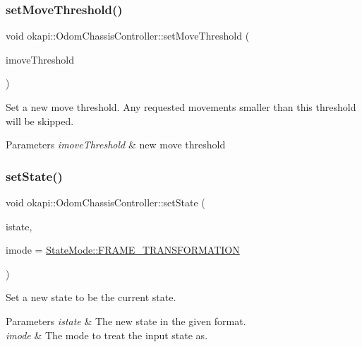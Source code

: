 \subsubsection{\texorpdfstring{setMoveThreshold()}{setMoveThreshold()}}
{\footnotesize\ttfamily void okapi\+::\+Odom\+Chassis\+Controller\+::set\+Move\+Threshold (\begin{DoxyParamCaption}\item[{const Q\+Length \&}]{imove\+Threshold }\end{DoxyParamCaption})\hspace{0.3cm}{\ttfamily [virtual]}}

Set a new move threshold. Any requested movements smaller than this threshold will be skipped.


\begin{DoxyParams}{Parameters}
{\em imove\+Threshold} & new move threshold \\
\hline
\end{DoxyParams}
\mbox{\label{classokapi_1_1OdomChassisController_a843ab24d9ed26ba68833ece0b28bf345}} 
\subsubsection{\texorpdfstring{setState()}{setState()}}
{\footnotesize\ttfamily void okapi\+::\+Odom\+Chassis\+Controller\+::set\+State (\begin{DoxyParamCaption}\item[{const \mbox{\hyperlink{structokapi_1_1OdomState}{Odom\+State}} \&}]{istate,  }\item[{const \mbox{\hyperlink{namespaceokapi_af37fbd761bd859a00ff4dd4a87dd8c07}{State\+Mode}} \&}]{imode = {\ttfamily \mbox{\hyperlink{namespaceokapi_af37fbd761bd859a00ff4dd4a87dd8c07ad5ed7666e5cebf60d3af20a5a46edf3b}{State\+Mode\+::\+F\+R\+A\+M\+E\+\_\+\+T\+R\+A\+N\+S\+F\+O\+R\+M\+A\+T\+I\+ON}}} }\end{DoxyParamCaption})\hspace{0.3cm}{\ttfamily [virtual]}}

Set a new state to be the current state.


\begin{DoxyParams}{Parameters}
{\em istate} & The new state in the given format. \\
\hline
{\em imode} & The mode to treat the input state as. \\
\hline
\end{DoxyParams}
\mbox{\label{classokapi_1_1OdomChassisController_a771daa37b47909a523571e9173f676d5}} 
